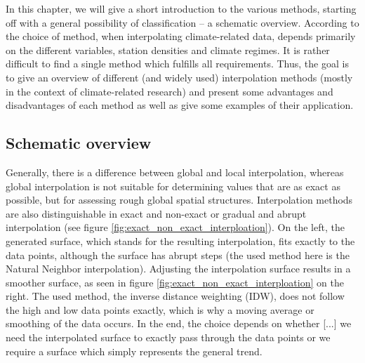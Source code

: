 In this chapter, we will give a short introduction to the various methods, starting off with a general possibility of classification – a schematic overview. According to \citeauthor{hofstra_comparison_2008} the choice of method, when interpolating climate-related data, depends primarily on the different variables, station densities and climate regimes. It is rather difficult to find a single method which fulfills all requirements. Thus, the goal is to give an overview of different (and widely used) interpolation methods (mostly in the context of climate-related research) and present some advantages and disadvantages of each method as well as give some examples of their application.

\subsection{Schematic overview}

Generally, there is a difference between global and local interpolation, whereas global interpolation is not suitable for determining values ​​that are as exact as possible, but for assessing rough global spatial structures. \cite{gitta_raumliche_2016}
Interpolation methods are also distinguishable in exact and non-exact or gradual and abrupt interpolation (see figure \ref{fig:exact_non_exact_interploation}). On the left, the generated surface, which stands for the resulting interpolation, fits exactly to the data points, although the surface has abrupt  \ldq{}steps\rdq{} (the used method here is the Natural Neighbor interpolation). Adjusting the interpolation surface results in a smoother surface, as seen in figure \ref{fig:exact_non_exact_interploation} on the right.
The used method, the inverse distance weighting (IDW), does not follow the high and low data points exactly, which is why a \ldq{}moving average\rdq{} or \ldq{}smoothing\rdq{} of the data occurs. In the end, the choice depends on whether  \ldq{}[...] we need the interpolated surface to exactly pass through the data points or we require a surface which simply represents the general trend\rdq{}. \cite{wyatt_interpolation_nodate}



